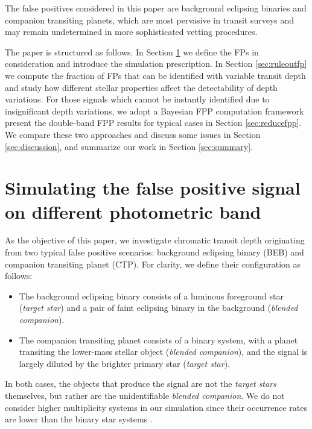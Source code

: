 \documentclass{aastex63}
\begin{document}
 The false positives considered in this paper are background eclipsing binaries and companion transiting planets, which are most pervasive in transit surveys and may remain undetermined in more sophisticated vetting procedures.
 
 The paper is structured as follows. In Section \ref{sec:fpsim} we define the FPs in consideration and introduce the simulation prescription. In Section \ref{sec:ruleoutfp} we compute the fraction of FPs that can be identified with variable transit depth and study how different stellar properties affect the detectability of depth variations. For those signals which cannot be instantly identified due to insignificant depth variations, we adopt a Bayesian FPP computation framework present the double-band FPP results for typical cases in Section \ref{sec:reducefpp}. We compare these two approaches and discuss some issues in Section \ref{sec:discussion}, and summarize our work in Section \ref{sec:summary}.
 
\section{Simulating the false positive signal on different photometric band}
\label{sec:fpsim}

As the objective of this paper, we investigate chromatic transit depth originating from two typical false positive scenarios: background eclipsing binary (BEB) and companion transiting planet (CTP). For clarity, we define their configuration as follows:

\begin{itemize}
    \item The background eclipsing binary consists of a luminous foreground star (\emph{target star}) and a pair of faint eclipsing binary in the background (\emph{blended companion}).
    \item The companion transiting planet consists of a binary system, with a planet transiting the lower-mass stellar object (\emph{blended companion}), and the signal is largely diluted by the brighter primary star (\emph{target star}).
\end{itemize}

In both cases, the objects that produce the signal are not the \emph{target stars} themselves, but rather are the unidentifiable \emph{blended companion}. We do not consider higher multiplicity systems in our simulation since their occurrence rates are lower than the binary star systems \citep{Raghavan2010}. 
\end{document}
